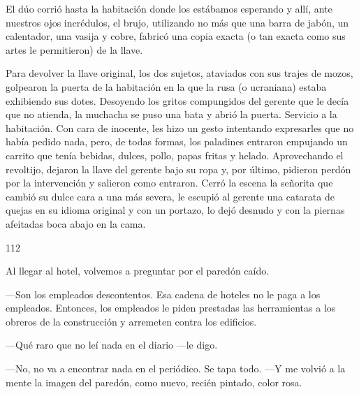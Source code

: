 \documentclass[12pt,twoside,openright,a5paper]{book}
\begin{document}
El dúo corrió hasta la habitación donde los estábamos esperando y allí,
ante nuestros ojos incrédulos, el brujo, utilizando no más que una barra
de jabón, un calentador, una vasija y cobre, fabricó una copia exacta
(o tan exacta como sus artes le permitieron) de la llave.

Para devolver la llave original, los dos sujetos, ataviados con sus trajes
de mozos, golpearon la puerta de la habitación en la que la rusa (o ucraniana)
estaba exhibiendo sus dotes. De\-so\-yen\-do los gritos compungidos del gerente
que le decía que no atienda, la muchacha se puso una bata y abrió la
puerta. Servicio a la habitación. Con cara de inocente, les hizo un gesto
intentando expresarles que no había pedido nada, pero, de todas formas, los
paladines entraron empujando un carrito que tenía bebidas, dulces, pollo,
papas fritas y helado. Aprovechando el revoltijo, dejaron la llave del
gerente bajo su ropa y, por último, pidieron perdón por la intervención y
salieron como entraron. Cerró la escena la señorita que cambió
su dulce cara a una más severa, le escupió al gerente una catarata de quejas
en su idioma original y con un portazo, lo dejó desnudo y con la piernas
afeitadas boca abajo en la cama.


\vspace{0.5cm}

\hrulefill \hspace{0.1cm}\decofourleft\hspace{0.2cm} 112 \hspace{0.2cm}\decofourright \hspace{0.1cm}\hrulefill

\nopagebreak

\vspace{0.5cm}

\nopagebreak

Al llegar al hotel, volvemos a preguntar por el paredón caído. 

---Son los
empleados descontentos. Esa cadena de hoteles no le paga a los empleados.
Entonces, los empleados le piden prestadas las herramientas a los obreros de
la construcción y arremeten contra los edificios.

---Qué raro que no leí
nada en el diario ---le digo.

---No, no va a encontrar nada en el periódico. Se
tapa todo. ---Y me volvió a la mente la imagen del paredón, como nuevo,
recién pintado, color rosa.

\vspace{0.5cm}
\end{document}
